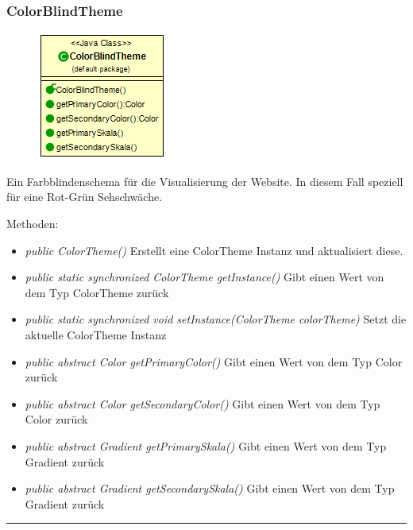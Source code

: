 \subsubsection{ColorBlindTheme}
\begin{minipage}{0.3\textwidth}
\begin{figure}[H]
    {\centering\includegraphics[scale = 0.5
    ]{media/view/theme/ColorBlindTheme_Class.png}}
\end{figure}
\end{minipage} \hfill
\begin{minipage}{0.6\textwidth}
    Ein Farbblindenschema für die Visualisierung der Website. In diesem Fall speziell für eine Rot-Grün Sehschwäche.
\end{minipage}
\vspace{\baselineskip}
Methoden: \begin{itemize} [noitemsep]
    \item \emph{public ColorTheme()} Erstellt eine ColorTheme Instanz und aktualisiert diese.
    \item \emph{public static synchronized ColorTheme getInstance()} Gibt einen Wert von dem Typ ColorTheme zurück
    \item \emph{public static synchronized void setInstance(ColorTheme colorTheme)} Setzt die aktuelle ColorTheme Instanz
    \item \emph{public abstract Color getPrimaryColor()} Gibt einen Wert von dem Typ Color zurück
    \item \emph{public abstract Color getSecondaryColor()} Gibt einen Wert von dem Typ Color zurück
    \item \emph{public abstract Gradient getPrimarySkala()} Gibt einen Wert von dem Typ Gradient zurück
    \item \emph{public abstract Gradient getSecondarySkala()}  Gibt einen Wert von dem Typ Gradient zurück
\end{itemize}

\rule{\textwidth}{0.4pt}
